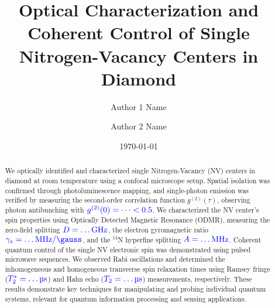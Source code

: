 \documentclass[aps,prb,twocolumn,superscriptaddress,floatfix,longbibliography,citeautoscript]{revtex4-2}
\newcommand{\mytitle}{Optical Characterization and Coherent Control of Single Nitrogen-Vacancy Centers in Diamond}
\begin{document}
\title{\mytitle}

\author{Author 1 Name}
\author{Author 2 Name}

\date{\today}

\begin{abstract}

We optically identified and characterized single Nitrogen-Vacancy (NV) centers in diamond at room temperature using a confocal microscope setup. Spatial isolation was confirmed through photoluminescence mapping, and single-photon emission was verified by measuring the second-order correlation function $g^{(2)}(\tau)$, observing photon antibunching with $\textcolor{blue}{g^{(2)}(0) = \dots < 0.5}$. We characterized the NV center's spin properties using Optically Detected Magnetic Resonance (ODMR), measuring the zero-field splitting $\textcolor{blue}{D = \dots \si{\giga\hertz}}$, the electron gyromagnetic ratio $\blue{\gamma_e = \dots \si{\mega\hertz\per\gauss}}$, and the $^{14}$N hyperfine splitting $\textcolor{blue}{A = \dots \si{\mega\hertz}}$. Coherent quantum control of the single NV electronic spin was demonstrated using pulsed microwave sequences. We observed Rabi oscillations and determined the inhomogeneous and homogeneous transverse spin relaxation times using Ramsey fringe ($\textcolor{blue}{T_2^* = \dots \si{\micro\second}}$) and Hahn echo ($\textcolor{blue}{T_2 = \dots \si{\micro\second}}$) measurements, respectively. These results demonstrate key techniques for manipulating and probing individual quantum systems, relevant for quantum information processing and sensing applications.

\end{abstract}
\end{document}
